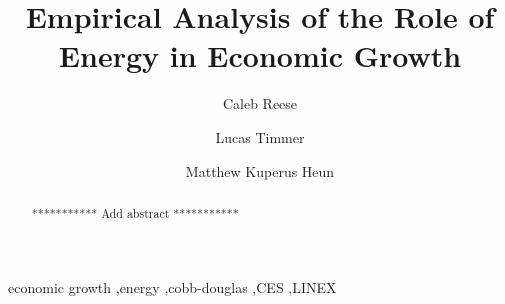 \documentclass[preprint,authoryear,12pt]{elsarticle}\usepackage{graphicx, color}
\begin{document}
\begin{frontmatter}



\title{Empirical Analysis of the Role of Energy in Economic Growth}


\author[Calvin]{Caleb Reese}
\author[Calvin]{Lucas Timmer}
\author[Calvin]{Matthew Kuperus Heun }

\address[Calvin]{Engineering Department, Calvin College, Grand Rapids, MI 49546, USA}

\begin{abstract}
*********** Add abstract ***********
\end{abstract}

\begin{keyword}
economic growth \sep energy \sep cobb-douglas \sep CES \sep LINEX
\end{keyword}

\end{frontmatter}

\end{document}
